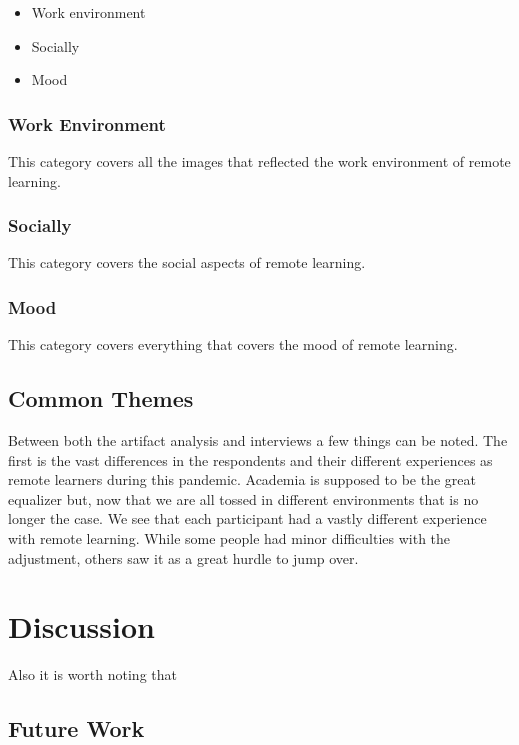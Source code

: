 \documentclass[12pt,
 reprint,
nofootinbib,
 amsmath,amssymb,
 aps,
]{revtex4-2}
\begin{document}
\begin{itemize}
    \item Work environment
    \item Socially
    \item Mood
\end{itemize}

\subsubsection{Work Environment}

This category covers all the images that reflected the work environment of remote learning.

\subsubsection{Socially}

This category covers the social aspects of remote learning. 

\subsubsection{Mood}

This category covers everything that covers the mood of remote learning. 

\subsection{Common Themes}

Between both the artifact analysis and interviews a few things can be noted. The first is the vast differences in the respondents and their different experiences as remote learners during this pandemic. Academia is supposed to be the great equalizer but, now that we are all tossed in different environments that is no longer the case. We see that each participant had a vastly different experience with remote learning. While some people had minor difficulties with the adjustment, others saw it as a great hurdle to jump over.


\section{Discussion}

Also it is worth noting that 



\subsection{Future Work}
\end{document}
